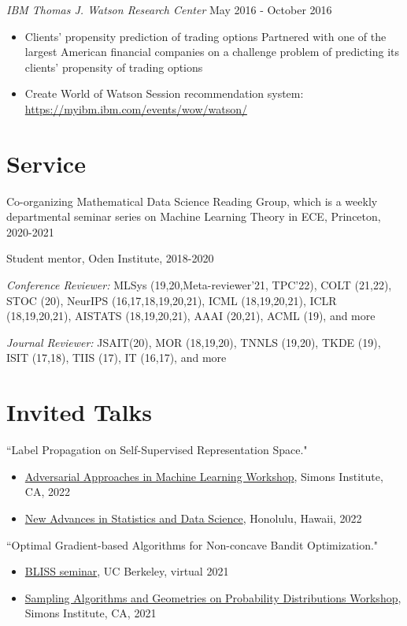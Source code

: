 \documentclass[margin, 10pt]{res} %
\begin{document}
\begin{resume}
{\sl IBM Thomas J. Watson Research Center} \hfill May 2016 - October 2016
\begin{itemize}
	\item  Clients' propensity prediction of trading options
	Partnered with one of the largest American financial companies on a challenge problem of predicting its clients' propensity of trading options
	\item Create World of Watson Session recommendation system:\\
	\url{https://myibm.ibm.com/events/wow/watson/}
\end{itemize} 



\section{Service}
Co-organizing Mathematical Data Science Reading Group, which is a weekly departmental seminar series on Machine Learning Theory in ECE, Princeton, 2020-2021 

Student mentor,  Oden Institute, 2018-2020

{\sl Conference Reviewer:} MLSys (19,20,Meta-reviewer'21, TPC'22), COLT (21,22), STOC (20), NeurIPS (16,17,18,19,20,21), ICML (18,19,20,21), ICLR (18,19,20,21), 
AISTATS (18,19,20,21), AAAI (20,21), ACML (19), and more

{\sl Journal Reviewer:} JSAIT(20), MOR (18,19,20), TNNLS (19,20), TKDE (19), ISIT (17,18), TIIS (17), 
IT (16,17), and more




 \section{Invited Talks}
 {``Label Propagation on Self-Supervised Representation Space."}
 	\begin{itemize}[noitemsep,topsep=0pt,parsep=0pt,partopsep=0pt]
	\item \href{https://simons.berkeley.edu/workshops/games2022-1}{Adversarial Approaches in Machine Learning Workshop}, Simons Institute, CA, 2022 
	\item \href{http://zke.fas.harvard.edu/HawaiiConference/Main.html}{New Advances in Statistics and Data Science}, Honolulu, Hawaii, 2022
\end{itemize}
 
{``Optimal Gradient-based Algorithms for Non-concave Bandit Optimization."}
 	\begin{itemize}[noitemsep,topsep=0pt,parsep=0pt,partopsep=0pt]
 		\item \href{http://bliss.eecs.berkeley.edu/Seminar/fa21/qi.html}{BLISS seminar}, UC Berkeley, virtual 2021
 		\item \href{https://simons.berkeley.edu/talks/optimal-gradient-based-algorithms-non-concave-bandit-optimization}{Sampling Algorithms and Geometries on Probability Distributions Workshop}, Simons Institute, CA, 2021 
 	\end{itemize}
 



\end{resume}
\end{document}
